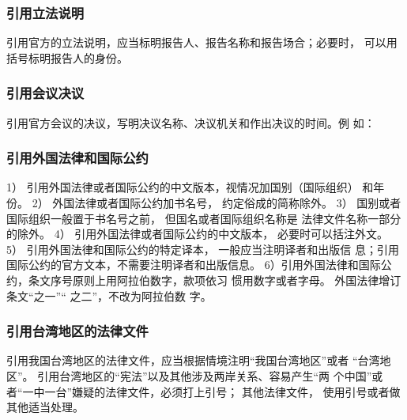 \documentclass{article}
\begin{document}
\subsubsection{引用立法说明}
引用官方的立法说明，应当标明报告人、报告名称和报告场合；必要时，
可以用括号标明报告人的身份。

\subsubsection{引用会议决议}
引用官方会议的决议，写明决议名称、决议机关和作出决议的时间。例
如：
\begin{quotation}
\end{quotation}


\subsubsection{引用外国法律和国际公约}
1） 引用外国法律或者国际公约的中文版本，视情况加国别（国际组织）
和年份。
2） 外国法律或者国际公约加书名号， 约定俗成的简称除外。
3） 国别或者国际组织一般置于书名号之前， 但国名或者国际组织名称是
法律文件名称一部分的除外。 
4） 引用外国法律或者国际公约的中文版本， 必要时可以括注外文。 
5） 引用外国法律和国际公约的特定译本， 一般应当注明译者和出版信
息；引用国际公约的官方文本，不需要注明译者和出版信息。
6）引用外国法律和国际公约，条文序号原则上用阿拉伯数字，款项依习
惯用数字或者字母。 外国法律增订条文“之一”“ 之二”，不改为阿拉伯数
字。

\subsubsection{引用台湾地区的法律文件}
引用我国台湾地区的法律文件，应当根据情境注明“我国台湾地区”或者
“台湾地区”。 引用台湾地区的“宪法”以及其他涉及两岸关系、容易产生“两
个中国”或者“一中一台”嫌疑的法律文件，必须打上引号； 其他法律文件，
使用引号或者做其他适当处理。 
\end{document}
